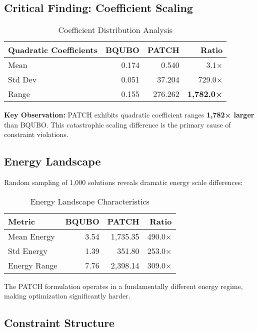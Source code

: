 \documentclass[11pt,a4paper]{article}
\begin{document}
\subsection{Critical Finding: Coefficient Scaling}

\begin{table}[H]
\centering
\caption{Coefficient Distribution Analysis}
\begin{tabular}{lrrr}
\toprule
\textbf{Quadratic Coefficients} & \textbf{BQUBO} & \textbf{PATCH} & \textbf{Ratio} \\
\midrule
Mean & 0.174 & 0.540 & 3.1× \\
Std Dev & 0.051 & 37.204 & 729.0× \\
Range & 0.155 & 276.262 & \textbf{1,782.0×} \\
\bottomrule
\end{tabular}
\label{tab:coefficients}
\end{table}

\textbf{Key Observation:} PATCH exhibits quadratic coefficient ranges \textbf{1,782× larger} than BQUBO. This catastrophic scaling difference is the primary cause of constraint violations.

\subsection{Energy Landscape}

Random sampling of 1,000 solutions reveals dramatic energy scale differences:

\begin{table}[H]
\centering
\caption{Energy Landscape Characteristics}
\begin{tabular}{lrrr}
\toprule
\textbf{Metric} & \textbf{BQUBO} & \textbf{PATCH} & \textbf{Ratio} \\
\midrule
Mean Energy & 3.54 & 1,735.35 & 490.0× \\
Std Energy & 1.39 & 351.80 & 253.0× \\
Energy Range & 7.76 & 2,398.14 & 309.0× \\
\bottomrule
\end{tabular}
\end{table}

The PATCH formulation operates in a fundamentally different energy regime, making optimization significantly harder.

\subsection{Constraint Structure}
\end{document}
